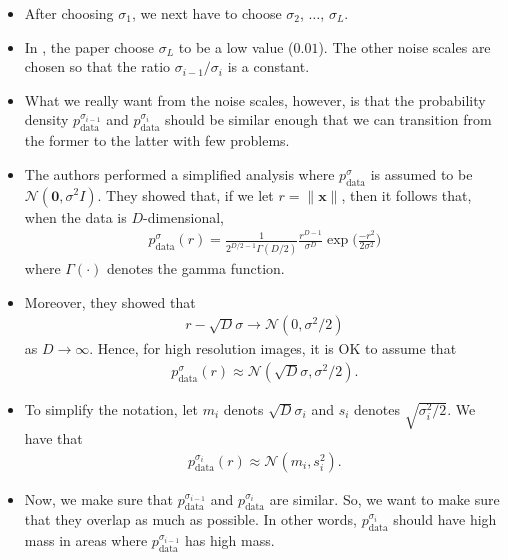 \documentclass[10pt]{article}
\newcommand{\ve}[1]{\mathbf{#1}}
\newcommand{\mrm}[1]{\mathrm{#1}}
\newcommand{\mcal}[1]{\mathcal{#1}}
\begin{document}
\begin{itemize}
  \item After choosing $\sigma_1$, we next have to choose $\sigma_2$, $\dotsc$, $\sigma_L$.
  
  \item In \cite{Song:2019}, the paper choose $\sigma_L$ to be a low value ($0.01$). The other noise scales are chosen so that the ratio $\sigma_{i-1}/\sigma_{i}$ is a constant.
  
  \item What we really want from the noise scales, however, is that the probability density $p_{\mrm{data}}^{\sigma_{i-1}}$ and $p_{\mrm{data}}^{\sigma_{i}}$ should be similar enough that we can transition from the former to the latter with few problems.
  
  \item The authors performed a simplified analysis where $p_{\mrm{data}}^{\sigma}$ is assumed to be $\mcal{N}(\ve{0},\sigma^2 I)$. They showed that, if we let $r = \| \ve{x} \|$, then it follows that, when the data is $D$-dimensional, 
  \begin{align*}
    p_{\mrm{data}}^{\sigma}(r) = \frac{1}{2^{D/2-1} \Gamma(D/2)} \frac{r^{D-1}}{\sigma^D} \exp\bigg( \frac{-r^2}{2\sigma^2} \bigg)
  \end{align*}
  where $\Gamma(\cdot)$ denotes the gamma function.

  \item Moreover, they showed that
  \begin{align*}
    r - \sqrt{D}\sigma \rightarrow \mcal{N}(0, \sigma^2/2)
  \end{align*}
  as $D \rightarrow \infty$. Hence, for high resolution images, it is OK to assume that
  \begin{align*}
    p_{\mrm{data}}^\sigma(r) \approx \mcal{N}(\sqrt{D}\sigma, \sigma^2/2).
  \end{align*}
  
  \item To simplify the notation, let $m_i$ denots $\sqrt{D}\sigma_i$ and $s_i$ denotes $\sqrt{\sigma^2_i/2}$. We have that
  \begin{align*}
    p_{\mrm{data}}^{\sigma_i}(r) \approx \mcal{N}(m_i, s_i^2).
  \end{align*}

  \item Now, we make sure that $p_{\mrm{data}}^{\sigma_{i-1}}$ and $p_{\mrm{data}}^{\sigma_{i}}$ are similar. So, we want to make sure that they overlap as much as possible. In other words, $p_{\mrm{data}}^{\sigma_{i}}$ should have high mass in areas where $p_{\mrm{data}}^{\sigma_{i-1}}$ has high mass.


\end{itemize}
\end{document}
